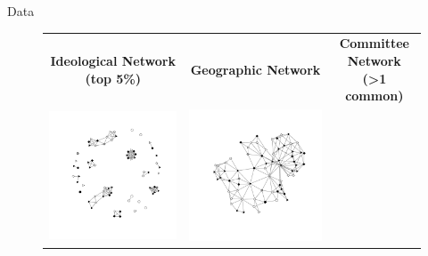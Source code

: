 \documentclass[final]{beamer}
\newlength{\onecolwid}
\newlength{\onecolwidd}
\begin{document}
\begin{frame}[t]
\begin{columns}[t]
\begin{column}{\onecolwidd}
\begin{block}{Data}
\begin{rmfamily}
	\hspace{2cm}
	\begin{figure}
	\centering
	\begin{tabular}{ccc}
	{\bf Ideological Network (top 5\%)} & {\bf Geographic Network} & {\bf Committee Network (>1 common)}\\
	\includegraphics[scale=0.8, clip=true,trim =2cm 2cm 2cm 2cm]{coppock_ideological_net.pdf} &
	\includegraphics[scale=0.8, clip=true,trim =2cm 2cm 2cm 2cm ]{coppock_geographic_net.pdf} & 

\end{tabular}
\end{figure}
\end{rmfamily}
\end{block}
\end{column}
\end{columns}
\end{frame}
\end{document}
